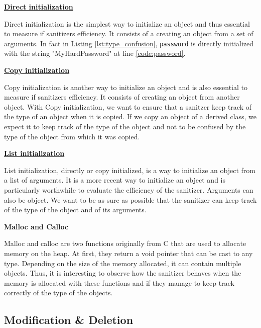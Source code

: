 \documentclass[a4paper,11pt,oneside]{report}
\begin{document}
\textbf{\href{https://en.cppreference.com/w/cpp/language/direct_initialization}{Direct
initialization}}

\noindent{}Direct initialization is the simplest way to initialize an object and
thus essential to measure if sanitizers efficiency. It consists of a creating an
object from a set of arguments.  In fact in Listing
\autoref{lst:type_confusion}, \texttt{password} is directly initialized with the
string "MyHardPassword" at line \ref{code:password}. 

\textbf{\href{https://en.cppreference.com/w/cpp/language/copy_initialization}{Copy
initialization}}

\noindent{}Copy initialization is another way to initialize an object and is
also essential to measure if sanitizers efficiency. It consists of creating an
object from another object. With Copy initialization, we want to ensure that a
sanitzer keep track of the type of an object when it is copied. If we copy an
object of a derived class, we expect it to keep track of the type of the object
and not to be confused by the type of the object from which it was copied.

\textbf{\href{https://en.cppreference.com/w/cpp/language/list_initialization}{List
initialization}}

\noindent{}List initialization, directly or copy initialized, is a way to
initialize an object from a list of arguments.  It is a more recent way to
initialize an object and is particularly worthwhile to evaluate the efficiency
of the sanitizer.  Arguments can also be object. We want to be as sure as
possible that the sanitizer can keep track of the type of the object and of its
arguments. 

\textbf{Malloc and Calloc}

\noindent{}Malloc and calloc are two functions originally from C that are used
to allocate memory on the heap. At first, they return a void pointer that can be
cast to any type. Depending on the size of the memory allocated, it can contain
multiple objects.  Thus, it is interesting to observe how the sanitizer behaves
when the memory is allocated with these functions and if they manage to keep
track correctly of the type of the objects.

\subsection{Modification \& Deletion}
\end{document}
